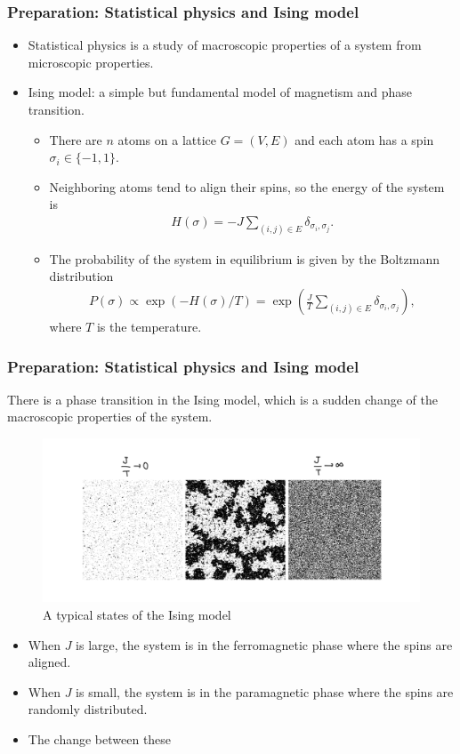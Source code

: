 \documentclass[dvipdfmx,11pt]{beamer}
\begin{document}
\begin{frame}
  \frametitle{Preparation: Statistical physics and Ising model}
  \begin{itemize}
    \item Statistical physics is a study of macroscopic properties of a system from microscopic properties.
    \item \alert{Ising model}: a simple but fundamental model of magnetism and phase transition.
    \begin{itemize}
      \item There are $n$ atoms on a lattice $G = (V, E)$ and each atom has a spin $\sigma_i \in \{-1, 1\}$.
      \item Neighboring atoms tend to align their spins, so the energy of the system is
      \begin{align*}
        H(\sigma) = - J \sum_{(i, j) \in E}  \delta_{\sigma_i, \sigma_j}.
      \end{align*}
      \item The probability of the system in equilibrium is given by the Boltzmann distribution
      \begin{align*}
        P(\sigma) \propto \exp(- H(\sigma) / T) = \exp( \frac{J}{T} \sum_{(i, j) \in E}  \delta_{\sigma_i, \sigma_j}),
      \end{align*}
      where $T$ is the temperature.
    \end{itemize}
  \end{itemize}
\end{frame}

\begin{frame}
  \frametitle{Preparation: Statistical physics and Ising model}
  There is a \alert{phase transition} in the Ising model, which is a sudden change of the macroscopic properties of the system.
  \begin{figure}
    \centering
    \includegraphics[width=0.6\linewidth]{figure/ising.jpeg}
    \caption{A typical states of the Ising model}
  \end{figure}
  \begin{itemize}
    \item When $J$ is large, the system is in the \alert{ferromagnetic phase} where the spins are aligned.
    \item When $J$ is small, the system is in the \alert{paramagnetic phase} where the spins are randomly distributed.
    \item The change between these 
  \end{itemize}
  
\end{frame}
\end{document}
